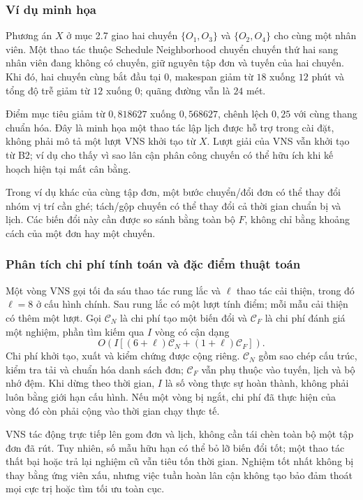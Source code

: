 \subsubsection{Ví dụ minh họa}
Phương án $X$ ở mục 2.7 giao hai chuyến $\{O_1,O_3\}$ và $\{O_2,O_4\}$ cho cùng một nhân viên. Một thao tác thuộc Schedule Neighborhood chuyển chuyến thứ hai sang nhân viên đang không có chuyến, giữ nguyên tập đơn và tuyến của hai chuyến. Khi đó, hai chuyến cùng bắt đầu tại $0$, makespan giảm từ $18$ xuống $12$ phút và tổng độ trễ giảm từ $12$ xuống $0$; quãng đường vẫn là $24$ mét.

Điểm mục tiêu giảm từ $0{,}818627$ xuống $0{,}568627$, chênh lệch $0{,}25$ với cùng thang chuẩn hóa. Đây là minh họa một thao tác lập lịch được hỗ trợ trong cài đặt, không phải mô tả một lượt VNS khởi tạo từ $X$. Lượt giải của VNS vẫn khởi tạo từ B2; ví dụ cho thấy vì sao lân cận phân công chuyến có thể hữu ích khi kế hoạch hiện tại mất cân bằng.

Trong ví dụ khác của cùng tập đơn, một bước chuyển/đổi đơn có thể thay đổi nhóm vị trí cần ghé; tách/gộp chuyến có thể thay đổi cả thời gian chuẩn bị và lịch. Các biến đổi này cần được so sánh bằng toàn bộ $F$, không chỉ bằng khoảng cách của một đơn hay một chuyến.

\subsubsection{Phân tích chi phí tính toán và đặc điểm thuật toán}
Một vòng VNS gọi tối đa sáu thao tác rung lắc và $\ell$ thao tác cải thiện, trong đó $\ell=8$ ở cấu hình chính. Sau rung lắc có một lượt tính điểm; mỗi mẫu cải thiện có thêm một lượt. Gọi $\mathcal C_N$ là chi phí tạo một biến đổi và $\mathcal C_F$ là chi phí đánh giá một nghiệm, phần tìm kiếm qua $I$ vòng có cận dạng
\begin{equation}
 O\!\left(I\left[(6+\ell)\mathcal C_N+(1+\ell)\mathcal C_F\right]\right).\label{eq:vns-cost}
\end{equation}
Chi phí khởi tạo, xuất và kiểm chứng được cộng riêng. $\mathcal C_N$ gồm sao chép cấu trúc, kiểm tra tải và chuẩn hóa danh sách đơn; $\mathcal C_F$ vẫn phụ thuộc vào tuyến, lịch và bộ nhớ đệm. Khi dừng theo thời gian, $I$ là số vòng thực sự hoàn thành, không phải luôn bằng giới hạn cấu hình. Nếu một vòng bị ngắt, chi phí đã thực hiện của vòng đó còn phải cộng vào thời gian chạy thực tế.

VNS tác động trực tiếp lên gom đơn và lịch, không cần tái chèn toàn bộ một tập đơn đã rút. Tuy nhiên, số mẫu hữu hạn có thể bỏ lỡ biến đổi tốt; một thao tác thất bại hoặc trả lại nghiệm cũ vẫn tiêu tốn thời gian. Nghiệm tốt nhất không bị thay bằng ứng viên xấu, nhưng việc tuần hoàn lân cận không tạo bảo đảm thoát mọi cực trị hoặc tìm tối ưu toàn cục.


